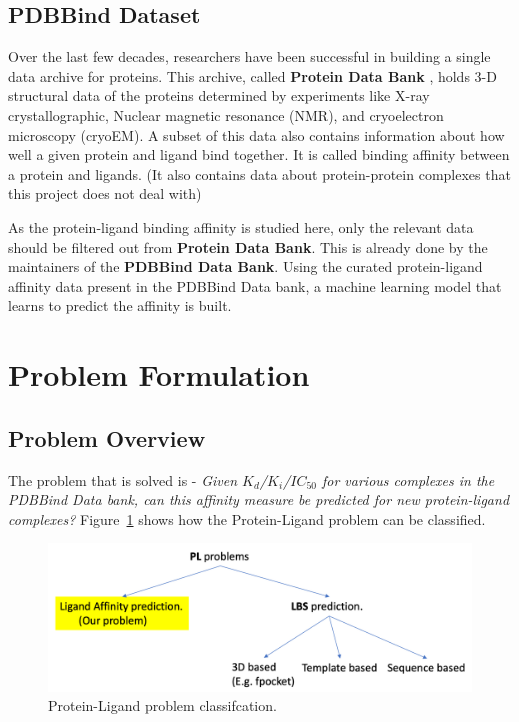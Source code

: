 \documentclass[11pt]{article}
\begin{document}
\subsection{PDBBind Dataset}
Over the last few decades, researchers have been successful in building a single data archive for proteins.  This archive, called \textbf{Protein Data Bank} \cite{pdb_homepage}, holds 3-D structural data of the proteins determined by experiments like X-ray crystallographic, Nuclear magnetic resonance (NMR), and cryoelectron microscopy (cryoEM).  A subset of this data also contains information about how well a given protein and ligand bind together.  It is called binding affinity between a protein and ligands.  (It also contains data about protein-protein complexes that this project does not deal with)
\cite{pdbank_history}

As the protein-ligand binding affinity is studied here,  only the relevant data should be filtered out from \textbf{Protein Data Bank}.  This is already done by the maintainers of the \textbf{PDBBind Data Bank}.
\cite{pdbbind_introduction}
Using the curated protein-ligand affinity data present in the PDBBind Data bank,  a machine learning model that learns to predict the affinity is built.

\section{Problem Formulation}
\subsection{Problem Overview}
\label{ProblemOverviewlabel}
The problem that is solved is - \textit{Given $K_d$/$K_i$/$IC_{50}$ for various complexes in the PDBBind Data bank,
can this affinity measure be predicted for new protein-ligand complexes?}
Figure~\ref{fig:plproblemclassification} shows how the Protein-Ligand problem can be classified.

\begin{figure}[htb]
  \centering
    \includegraphics[scale=0.35]{images/pl_problem_classification}
    \caption{Protein-Ligand problem classifcation.}
    \label{fig:plproblemclassification}
\end{figure}
\end{document}
